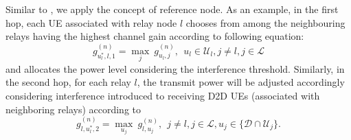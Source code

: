 \documentclass[twocolumn,10pt]{IEEEtran}
\begin{document}
Similar to \cite{ref_user}, we apply the concept of reference node. As an example, in the first hop, each UE associated with relay node $l$ chooses from among the neighbouring relays having the highest channel gain according to following equation:
\begin{equation}
g_{{u_l^*}, l, 1}^{(n)} = \underset{j}{\operatorname{max}} ~ g_{u_l , j}^{(n)},~~ u_l \in \mathcal{U}_l, j \neq l, j \in \mathcal{L} \label{eq:ref_user1}
\end{equation}
and allocates the power level considering the interference threshold. Similarly, in the second hop, for each relay $l$, the transmit power   will be adjusted accordingly considering interference introduced to receiving D2D UEs (associated with neighboring relays) according to 
\begin{equation}
g_{l, {u_l^*}, 2}^{(n)} = \underset{u_j}{\operatorname{max}} ~ g_{l , u_j}^{(n)}, ~~ j \neq l, j \in \mathcal{L},  u_j \in \lbrace \mathcal{D} \cap \mathcal{U}_j \rbrace. \label{eq:ref_user2}
\end{equation}
\end{document}
